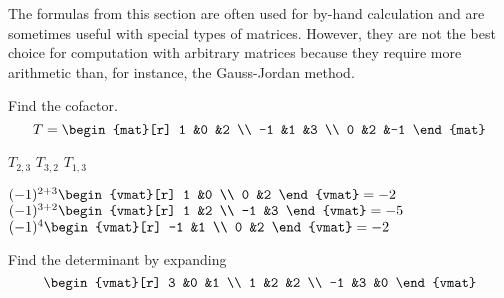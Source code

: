 The formulas from this section are often used for by-hand
calculation and are sometimes useful with special types of matrices.
However, they are
not the best choice for computation with arbitrary matrices
because they require more arithmetic than, for instance, the 
Gauss-Jordan method.




\begin{exercises}
  \recommended \item 
    Find the cofactor.
    \begin{equation*}
      T=\begin{mat}[r]
          1  &0  &2  \\
         -1  &1  &3  \\
          0  &2  &-1
        \end{mat}
    \end{equation*}
    \begin{exparts*}
       \partsitem \( T_{2,3} \)
       \partsitem \( T_{3,2} \)
       \partsitem \( T_{1,3} \)
    \end{exparts*}
    \begin{answer}
      \begin{exparts*}
       \partsitem \( (-1)^{2+3}\begin{vmat}[r]
                            1  &0  \\
                            0  &2
                          \end{vmat}=-2  \)
       \partsitem \( (-1)^{3+2}\begin{vmat}[r]
                            1  &2  \\
                           -1  &3
                          \end{vmat}=-5  \)
       \partsitem \( (-1)^{4}\begin{vmat}[r]
                           -1  &1  \\
                            0  &2
                          \end{vmat}=-2  \)
      \end{exparts*}  
    \end{answer}
  \recommended \item 
    Find the determinant
    by expanding
    \begin{equation*}
      \begin{vmat}[r]
         3  &0  &1  \\
         1  &2  &2  \\
        -1  &3  &0
      \end{vmat}

\end{equation*}
\end{exercises}
